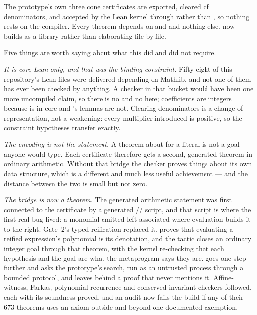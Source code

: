 The prototype's own three cone certificates are exported, cleared of
denominators, and accepted by the Lean kernel through  rather than
, so nothing rests on the compiler. Every theorem depends
on  and  and nothing else. 
now builds as a library rather than elaborating file by file.

Five things are worth saying about what this did and did not require.

\emph{It is core Lean only, and that was the binding constraint.} Fifty-eight of
this repository's Lean files were delivered depending on Mathlib, and not one of
them has ever been checked by anything. A checker in that bucket would have been
one more uncompiled claim, so there is no  and no  here;
coefficients are integers because  is in core and 's
lemmas are not. Clearing denominators is a change of representation, not a
weakening: every multiplier introduced is positive, so the constraint hypotheses
transfer exactly.

\emph{The encoding is not the statement.} A theorem about
 for a  literal is not a goal anyone would
type. Each certificate therefore gets a second, generated theorem in ordinary
arithmetic. Without that bridge the checker proves things about its own data
structure, which is a different and much less useful achievement --- and the
distance between the two is small but not zero.

\emph{The bridge is now a theorem.} The generated arithmetic statement was
first connected to the certificate by a generated //
 script, and that script is where the first real bug lived: a
monomial emitted left-associated where evaluation builds it to the right.
Gate~2's typed reification replaced it.  proves that
evaluating a reified expression's polynomial is its denotation, and the
 tactic closes an ordinary integer goal through that theorem,
with the kernel re-checking that each hypothesis and the goal are what the
metaprogram says they are.  goes one step further and asks the
prototype's search, run as an untrusted process through a bounded protocol, and
leaves behind a proof that never mentions it. Affine-witness, Farkas,
polynomial-recurrence and conserved-invariant checkers followed, each with its
soundness proved, and an audit now fails the build if any of their 673 theorems
uses an axiom outside  and  beyond one documented
exemption.

